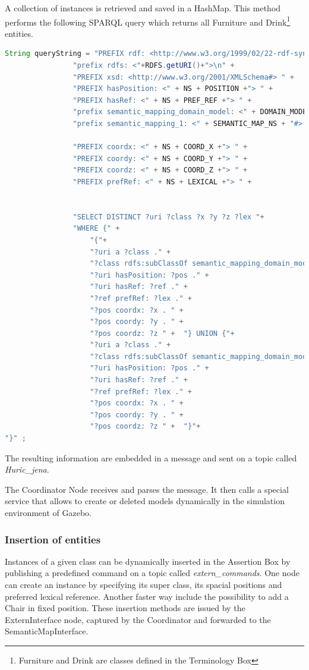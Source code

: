 A collection of instances is retrieved and saved in a HashMap. This method performs the following SPARQL query which returns all Furniture and Drink\footnote{Furniture and Drink are classes defined in the Terminology Box} entities.

\begin{lstlisting}[language=Java]
String queryString = "PREFIX rdf: <http://www.w3.org/1999/02/22-rdf-syntax-ns#>" +
				"prefix rdfs: <"+RDFS.getURI()+">\n" +
	    		"PREFIX xsd: <http://www.w3.org/2001/XMLSchema#> " +
	    		"PREFIX hasPosition: <" + NS + POSITION +"> " +
	    		"PREFIX hasRef: <" + NS + PREF_REF +"> " +
				"prefix semantic_mapping_domain_model: <" + DOMAIN_MODEL_NS + "#> \n"+
				"prefix semantic_mapping_1: <" + SEMANTIC_MAP_NS + "#> \n"+
	    		
	    		"PREFIX coordx: <" + NS + COORD_X +"> " +
	    		"PREFIX coordy: <" + NS + COORD_Y +"> " +
	    		"PREFIX coordz: <" + NS + COORD_Z +"> " +
	    		"PREFIX prefRef: <" + NS + LEXICAL +"> " +
	    		
	    		
	    		"SELECT DISTINCT ?uri ?class ?x ?y ?z ?lex "+
	    		"WHERE {" + 
	    			"{"+
		    		"?uri a ?class ." + 
		    		"?class rdfs:subClassOf semantic_mapping_domain_model:Furniture ."+
		    		"?uri hasPosition: ?pos ." + 
		    		"?uri hasRef: ?ref ." + 
		    		"?ref prefRef: ?lex ." + 
		    		"?pos coordx: ?x . " + 
		    		"?pos coordy: ?y . " + 
		    		"?pos coordz: ?z " +  "} UNION {"+
		    		"?uri a ?class ." + 
		    		"?class rdfs:subClassOf semantic_mapping_domain_model:Drink ." +
		    		"?uri hasPosition: ?pos ." + 
		    		"?uri hasRef: ?ref ." + 
		    		"?ref prefRef: ?lex ." + 
		    		"?pos coordx: ?x . " + 
		    		"?pos coordy: ?y . " + 
		    		"?pos coordz: ?z " +  "}"+
"}" ;
\end{lstlisting}
The resulting information are embedded in a message and sent on a topic called \textit{Huric\_jena}.

The Coordinator Node receives and parses the message. It then calls a special service that allows to create or deleted models dynamically in the simulation environment of Gazebo.


\subsubsection{Insertion of entities}
Instances of a given class can be dynamically inserted in the Assertion Box by publishing a predefined command on a topic called \textit{extern\_commands}. One node can create an instance by specifying its super class, its spacial positions and preferred lexical reference. Another faster way include the possibility to add a Chair in fixed position. These insertion methods are issued by the ExternInterface node, captured by the Coordinator and forwarded to the SemanticMapInterface.


